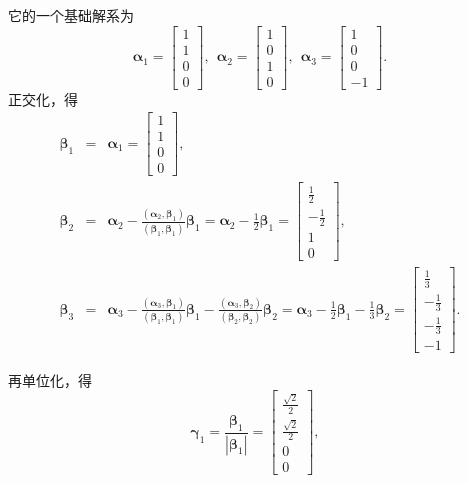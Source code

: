 \documentclass[compress,mathserif,cjk]{beamer}
\theoremstyle{remark}
\numberwithin{equation}{section}
\begin{document}
\begin{CJK}{UTF8}{gbsn}
\begin{frame}\small
它的一个基础解系为
$$\bm\alpha_1=\left[\begin{matrix}1\\1\\0\\0\end{matrix}\right],~~\bm\alpha_2=\left[\begin{matrix}1\\0\\1\\0\end{matrix}\right],
~~\bm\alpha_3=\left[\begin{matrix}1\\0\\0\\-1\end{matrix}\right].$$
\pause 正交化，得
\begin{eqnarray*}
\bm\beta_1&=&\bm\alpha_1=\left[\begin{matrix}1\\1\\0\\0\end{matrix}\right],\\
\bm\beta_2&=&\bm\alpha_2-\frac{(\bm\alpha_2,\bm\beta_1)}{(\bm\beta_1,\bm\beta_1)}\bm\beta_1=\bm\alpha_2-\frac{1}{2}\bm\beta_1
=\left[\begin{matrix}\frac{1}2\\-\frac{1}2\\1\\0\end{matrix}\right],\\
\bm\beta_3&=&\bm\alpha_3-\frac{(\bm\alpha_3,\bm\beta_1)}{(\bm\beta_1,\bm\beta_1)}\bm\beta_1-\frac{(\bm\alpha_3,\bm\beta_2)}{(\bm\beta_2,\bm\beta_2)}\bm\beta_2
=\bm\alpha_3-\frac{1}{2}\bm\beta_1-\frac{1}{3}\bm\beta_2=\left[\begin{matrix}\frac{1}3\\-\frac{1}3\\-\frac{1}3\\-1\end{matrix}\right].
\end{eqnarray*}
\end{frame}
\begin{frame}\small
再单位化，得
\begin{equation*}
\bm\gamma_1=\frac{\bm\beta_1}{|\bm\beta_1|}=\left[\begin{matrix}\frac{\sqrt2}2\\\frac{\sqrt2}2\\0\\0\end{matrix}\right],~~~

\end{equation*}
\end{frame}
\end{CJK}
\end{document}
